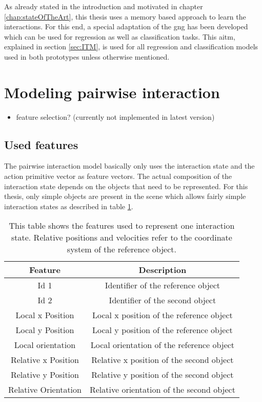 As already stated in the introduction and motivated in chapter \ref{chap:stateOfTheArt}, this thesis uses a memory based approach to learn the interactions. For this end, a special adaptation of the \gls{gng} has been developed which can be used for regression as well as classification tasks. This \gls{aitm}, explained in section \ref{sec:ITM}, is used for all regression and classification models used in both prototypes unless otherwise mentioned. 

\section{Modeling pairwise interaction \label{sec:pairRealization}}

\begin{itemize}
	\item feature selection? (currently not implemented in latest version)
\end{itemize}



\subsection{Used features \label{sec:intFeatures}}

The pairwise interaction model basically only uses the interaction state and the action primitive vector as feature vectors. The actual composition of the interaction state depends on the objects that need to be represented. For this thesis, only simple objects are present in the scene which allows fairly simple interaction states as described in table \ref{tab:pairInteractionFeatures}.

\begin{table}
	\centering
	\begin{tabular}{|c|c|}
		\hline Feature & Description \\ 
		\hline Id 1 & Identifier of the reference object \\ 
		\hline Id 2 & Identifier of the second object \\ 
		\hline Local x Position & Local x position of the reference object \\
		\hline Local y Position & Local y position of the reference object \\
		\hline Local orientation & Local orientation of the reference object \\
		\hline Relative x Position & Relative x position of the second object \\
		\hline Relative y Position & Relative y position of the second object \\
		\hline Relative Orientation & Relative orientation of the second object \\
		\hline 
	\end{tabular} 
	\caption{This table shows the features used to represent one interaction state. Relative positions and velocities refer to the coordinate system of the reference object.}
	\label{tab:pairInteractionFeatures}
\end{table}

